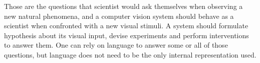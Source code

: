 Those are the questions that scientist would ask themselves when observing a new natural phenomena, and a computer vision system should behave as a scientist when confronted with a new visual stimuli. A system should formulate hypothesis about its visual input, devise experiments and perform interventions to answer them. One can rely on language to answer some or all of those questions, but language does not need to be the only internal representation used.


















	
		
		

		

			
		
	

